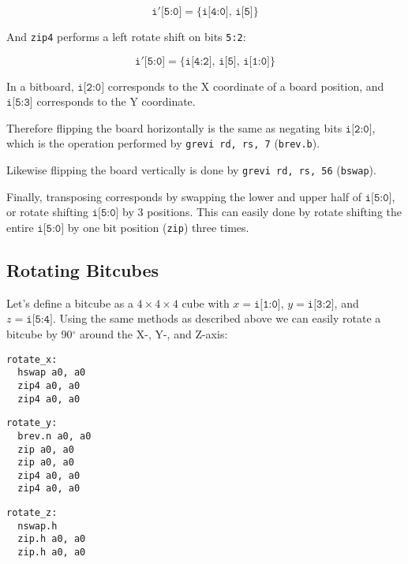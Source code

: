 $$\texttt{i$'$[5:0]} = \{ \texttt{i[4:0]},\, \texttt{i[5]} \}$$

And {\tt zip4} performs a left rotate shift on bits {\tt 5:2}:

$$\texttt{i$'$[5:0]} = \{ \texttt{i[4:2]},\, \texttt{i[5]},\, \texttt{i[1:0]} \}$$

In a bitboard, $\texttt{i[2:0]}$ corresponds to the X coordinate of a board position, and
$\texttt{i[5:3]}$ corresponds to the Y coordinate.

Therefore flipping the board horizontally is the same as negating bits $\texttt{i[2:0]}$,
which is the operation performed by {\tt grevi rd, rs, 7} ({\tt brev.b}).

Likewise flipping the board vertically is done by {\tt grevi rd, rs, 56} ({\tt bswap}).

Finally, transposing corresponds by swapping the lower and upper half of $\texttt{i[5:0]}$,
or rotate shifting $\texttt{i[5:0]}$ by 3 positions. This can easily done by rotate shifting the entire
$\texttt{i[5:0]}$ by one bit position ({\tt zip}) three times.

\subsection{Rotating Bitcubes}

Let's define a bitcube as a $4 \times 4 \times 4$ cube with $x=\texttt{i[1:0]}$,
$y=\texttt{i[3:2]}$, and $z=\texttt{i[5:4]}$. Using the same methods as described
above we can easily rotate a bitcube by 90$^\circ$ around the X-, Y-, and Z-axis:

\begin{multicols}{3}
\begin{minipage}{\linewidth}
\begin{verbatim}
rotate_x:
  hswap a0, a0
  zip4 a0, a0
  zip4 a0, a0
\end{verbatim}
\end{minipage}

\begin{minipage}{\linewidth}
\begin{verbatim}
rotate_y:
  brev.n a0, a0
  zip a0, a0
  zip a0, a0
  zip4 a0, a0
  zip4 a0, a0
\end{verbatim}
\end{minipage}

\begin{minipage}{\linewidth}
\begin{verbatim}
rotate_z:
  nswap.h
  zip.h a0, a0
  zip.h a0, a0
\end{verbatim}
\end{minipage}
\end{multicols}

